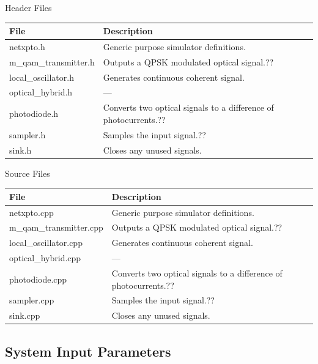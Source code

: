 Header Files
\begin{table}[H]
\centering
\begin{tabulary}{1.0\textwidth}{|L|L|}
\hline
\textbf{File}           & \textbf{Description}                           \\
\hline
netxpto.h               & Generic purpose simulator definitions.         \\
\hline
m\_qam\_transmitter.h   & Outputs a QPSK modulated optical signal.??\\
\hline
local\_oscillator.h     & Generates continuous coherent signal.            \\
\hline
optical\_hybrid.h       & ---\\
\hline
photodiode.h            & Converts two optical signals to a difference of photocurrents.??\\
\hline
sampler.h               & Samples the input signal.??\\
\hline
sink.h                  & Closes any unused signals.                       \\
\hline
\end{tabulary}
\end{table}
%
%
Source Files
\begin{table}[H]
\centering
\begin{tabulary}{1.0\textwidth}{|L|L|}
\hline
\textbf{File}                   & \textbf{Description}\\
\hline
netxpto.cpp                     & Generic purpose simulator definitions.\\
\hline
m\_qam\_transmitter.cpp         & Outputs a QPSK modulated optical signal.??\\
\hline
local\_oscillator.cpp           & Generates continuous coherent signal.\\
\hline
optical\_hybrid.cpp             & ---\\
\hline
photodiode.cpp                  & Converts two optical signals to a difference of photocurrents.??\\
\hline
sampler.cpp                     & Samples the input signal.??\\
\hline
sink.cpp                        & Closes any unused signals.\\
\hline
\end{tabulary}
\end{table}


\subsection*{System Input Parameters}

